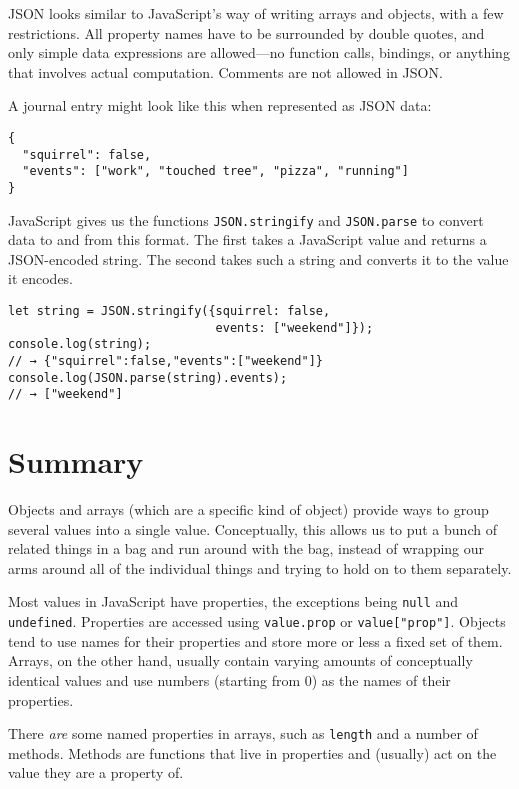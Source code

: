 JSON looks similar to JavaScript's way of writing arrays and objects, with a few restrictions. All property names have to be surrounded by double quotes, and only simple data expressions are allowed—no function calls, bindings, or anything that involves actual computation. Comments are not allowed in JSON.

A journal entry might look like this when represented as JSON data:

\begin{lstlisting}
{
  "squirrel": false,
  "events": ["work", "touched tree", "pizza", "running"]
}
\end{lstlisting}
\noindent{}

JavaScript gives us the functions \lstinline`JSON.stringify` and \lstinline`JSON.parse` to convert data to and from this format. The first takes a JavaScript value and returns a JSON-encoded string. The second takes such a string and converts it to the value it encodes.

\begin{lstlisting}
let string = JSON.stringify({squirrel: false,
                             events: ["weekend"]});
console.log(string);
// → {"squirrel":false,"events":["weekend"]}
console.log(JSON.parse(string).events);
// → ["weekend"]
\end{lstlisting}
\noindent

\section{Summary}

Objects and arrays (which are a specific kind of object) provide ways to group several values into a single value. Conceptually, this allows us to put a bunch of related things in a bag and run around with the bag, instead of wrapping our arms around all of the individual things and trying to hold on to them separately.

Most values in JavaScript have properties, the exceptions being \lstinline`null` and \lstinline`undefined`. Properties are accessed using \lstinline`value.prop` or \lstinline`value["prop"]`. Objects tend to use names for their properties and store more or less a fixed set of them. Arrays, on the other hand, usually contain varying amounts of conceptually identical values and use numbers (starting from 0) as the names of their properties.

There \emph{are} some named properties in arrays, such as \lstinline`length` and a number of methods. Methods are functions that live in properties and (usually) act on the value they are a property of.

